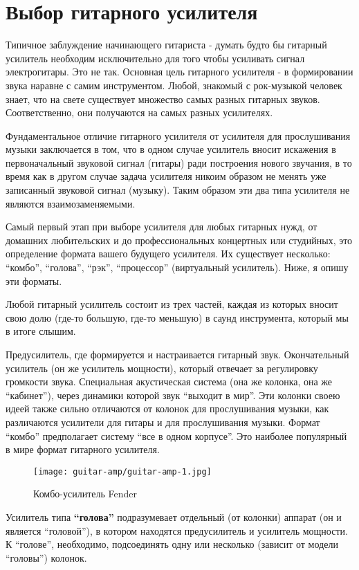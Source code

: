\section{Выбор гитарного усилителя}
Типичное заблуждение начинающего гитариста - думать будто бы гитарный усилитель необходим исключительно для того чтобы усиливать сигнал электрогитары. Это не так. Основная цель гитарного усилителя - в формировании звука наравне с самим инструментом. Любой, знакомый с рок-музыкой человек знает, что на свете существует множество самых разных гитарных звуков. Соответственно, они получаются на самых разных усилителях.

Фундаментальное отличие гитарного усилителя от усилителя для прослушивания музыки заключается в том, что в одном случае усилитель вносит искажения в первоначальный звуковой сигнал (гитары) ради построения нового звучания, в то время как в другом случае задача усилителя никоим образом не менять уже записанный звуковой сигнал (музыку). Таким образом эти два типа усилителя не являются взаимозаменяемыми.

Самый первый этап при выборе усилителя для любых гитарных нужд, от домашних любительских и до профессиональных концертных или студийных, это определение формата вашего будущего усилителя. Их существует несколько: “комбо”, “голова”, “рэк”, “процессор” (виртуальный усилитель). Ниже, я опишу эти форматы.

Любой гитарный усилитель состоит из трех частей, каждая из которых вносит свою долю (где-то большую, где-то меньшую) в саунд инструмента, который мы в итоге слышим.

Предусилитель, где формируется и настраивается гитарный звук.
Окончательный усилитель (он же усилитель мощности), который отвечает за регулировку громкости звука.
Специальная акустическая система (она же колонка, она же “кабинет”), через динамики которой звук “выходит в мир”. Эти колонки своею идеей также сильно отличаются от колонок для прослушивания музыки, как различаются усилители для гитары и для прослушивания музыки.
Формат “комбо” предполагает систему “все в одном корпусе”. Это наиболее популярный в мире формат гитарного усилителя.

\begin{figure}[H]
\centering
\texttt{[image: guitar-amp/guitar-amp-1.jpg]}
\caption{Комбо-усилитель Fender}
\label{guitar-amp:1}
\end{figure}

Усилитель типа \textbf{“голова”} подразумевает отдельный (от колонки) аппарат (он и является “головой”), в котором находятся предусилитель и усилитель мощности. К “голове”, необходимо, подсоединять одну или несколько (зависит от модели “головы”) колонок.

